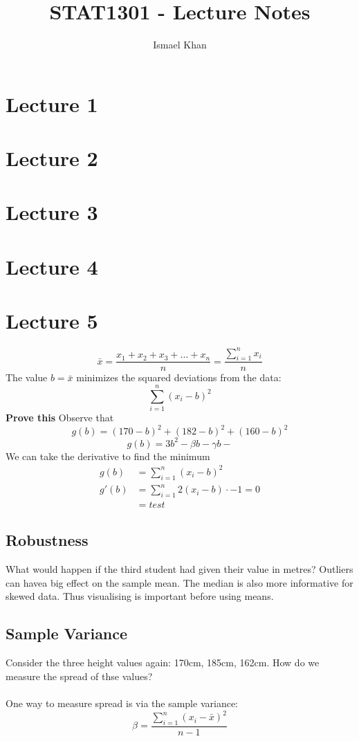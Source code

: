 \documentclass[a6paper]{article}
\title{STAT1301 - Lecture Notes}
\author{Ismael Khan}
\date{}
\theoremstyle{definition}
\theoremstyle{plain}
\theoremstyle{remark}
\begin{document}
\maketitle
\noindent
\section{Lecture 1}
\section{Lecture 2}
\section{Lecture 3}
\section{Lecture 4}
\section{Lecture 5}
$$ \bar{x} = \frac{x_1 + x_2 + x_3 + ... + x_n}{n} = \frac{\displaystyle \sum_{i=1}^n x_i}{n} $$
The value $ b = \bar{x} $ minimizes the squared deviations from the data:
$$ \sum_{i=1}^n (x_i - b)^2 $$
\textbf{Prove this}
Observe that 
$$ g(b) = (170 - b)^2 + (182 - b)^2 + (160 - b)^2 $$
$$ g(b) = 3b^2 - \beta b - \gamma b -  $$
We can take the derivative to find the minimum
\begin{align*}
	g(b) &= \sum_{i=1}^n (x_i - b)^2\\
	g'(b) &= \sum_{i=1}^n 2(x_i -b) \cdot -1 = 0\\
	      &= test
\end{align*}

\subsection{Robustness}
What would happen if the third student had given their value in metres? Outliers can havea  big effect on the sample mean. The median is also more informative for skewed data. Thus visualising is important before using means.

\subsection{Sample Variance}
Consider the three height values again: 170cm, 185cm, 162cm. How do we measure the spread of thse values?\\\\
One way to measure spread is via the sample variance:
$$ \beta = \frac{\sum_{i=1}^n (x_i - \bar{x})^2}{n-1} $$
\end{document}
